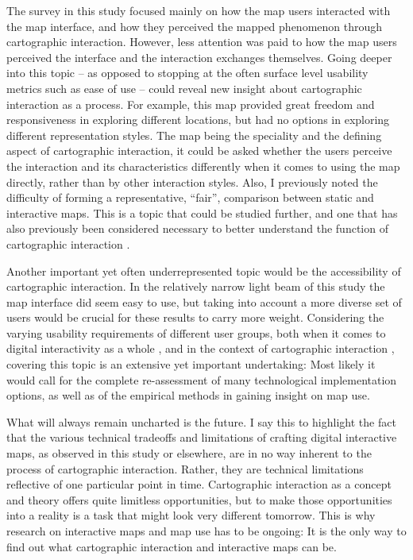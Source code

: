 The survey in this study focused mainly on how the map users interacted with the map interface,
and how they perceived the mapped phenomenon through cartographic interaction.
However, less attention was paid to how the map users perceived
the interface and the interaction exchanges themselves.
Going deeper into this topic --
as opposed to stopping at the often surface level usability metrics such as ease of use --
could reveal new insight about cartographic interaction as a process.
For example, this map provided great freedom and responsiveness in exploring different locations,
but had no options in exploring different representation styles.
The map being the speciality and the defining aspect of cartographic interaction,
it could be asked whether the users perceive the interaction and its characteristics differently when
it comes to using the map directly, rather than by other interaction styles.
Also, I previously noted the difficulty of forming a representative, \enquote{fair},
comparison between static and interactive maps.
This is a topic that could be studied further,
and one that has also previously been considered necessary
to better understand the function of cartographic interaction \parencite{rot2017}.

Another important yet often underrepresented topic would be
the accessibility of cartographic interaction.
In the relatively narrow light beam of this study
the map interface did seem easy to use,
but taking into account a more diverse set of users would be
crucial for these results to carry more weight.
Considering the varying usability requirements of different user groups, both
when it comes to digital interactivity as a whole \parencite{kul2019},
and in the context of cartographic interaction \parencite{bro2015, duc2018},
covering this topic is an extensive yet important undertaking:
Most likely it would call for the complete re-assessment
of many technological implementation options,
as well as of the empirical methods in gaining insight on map use.

What will always remain uncharted is the future.
I say this to highlight the fact that
the various technical tradeoffs and limitations of crafting digital interactive maps,
as observed in this study or elsewhere,
are in no way inherent to the process of cartographic interaction.
Rather, they are technical limitations reflective of one particular point in time.
Cartographic interaction as a concept and theory offers quite limitless opportunities,
but to make those opportunities into a reality is a task that
might look very different tomorrow.
This is why research on interactive maps and map use has to be ongoing:
It is the only way to find out what cartographic interaction and interactive maps can be.






